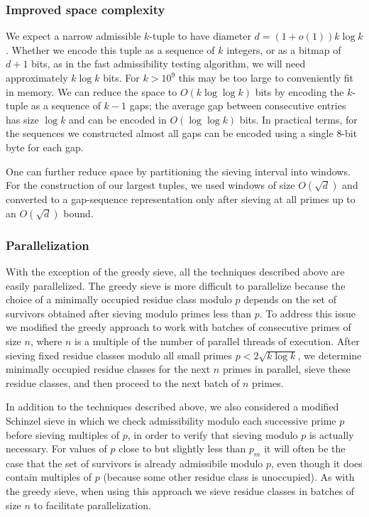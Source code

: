 \documentclass{bmcart}
\theoremstyle{plain}
\theoremstyle{definition}
\begin{document}
\subsubsection{Improved space complexity}
We expect a narrow admissible $k$-tuple to have diameter $d=(1+o(1))k\log k$.
Whether we encode this tuple as a sequence of $k$ integers, or as a bitmap of $d+1$ bits, as in the fast admissibility testing algorithm, we will need approximately $k\log k$ bits.  For $k > 10^9$ this may be too large to conveniently fit in memory.  We can reduce the space to $O(k\log\log k)$ bits by encoding the $k$-tuple as a sequence of $k-1$ gaps; the average gap between consecutive entries has size $\log k$ and can be encoded in $O(\log\log k)$ bits.
In practical terms, for the sequences we constructed almost all gaps can be encoded using a single 8-bit byte for each gap.

One can further reduce space by partitioning the sieving interval into windows.
For the construction of our largest tuples, we used windows of size $O(\sqrt{d})$ and converted to a gap-sequence representation only after sieving at all primes up to an $O(\sqrt{d})$ bound.

\subsubsection{Parallelization}
With the exception of the greedy sieve, all the techniques described above are easily parallelized.
The greedy sieve is more difficult to parallelize because the choice of a minimally occupied residue class modulo $p$ depends on the set of survivors obtained after sieving modulo primes less than $p$.
To address this issue we modified the greedy approach to work with batches of consecutive primes of size $n$, where $n$ is a multiple of the number of parallel threads of execution.  After sieving fixed residue classes modulo all small primes $p < 2\sqrt{k\log k}$, we determine minimally occupied residue classes for the next $n$ primes in parallel, sieve these residue classes, and then proceed to the next batch of $n$ primes.

In addition to the techniques described above, we also considered a modified Schinzel sieve in which we check admissibility modulo each successive prime $p$ before sieving multiples of $p$, in order to verify that sieving modulo $p$ is actually necessary.  For values of $p$ close to but slightly less than $p_m$ it will often be the case that the set of survivors is already admissibile modulo $p$, even though it does contain multiples of $p$ (because some other residue class is unoccupied).
As with the greedy sieve, when using this approach we sieve residue classes in batches of size $n$ to facilitate parallelization.
\end{document}

